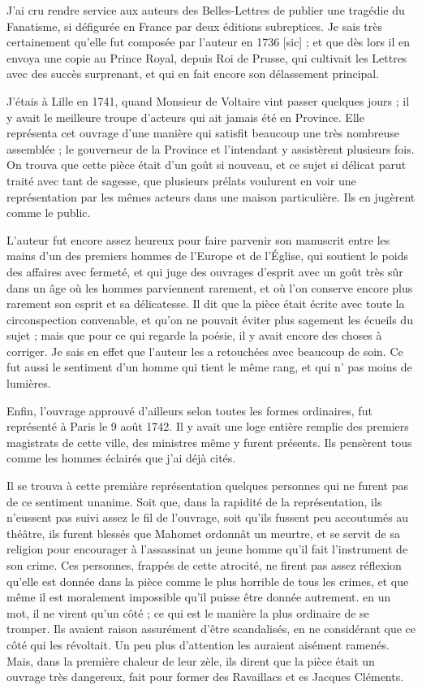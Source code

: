 \documentclass[french,twoside]{book} %
\begin{document}
\noindent J’ai cru rendre service aux auteurs des Belles-Lettres de publier une tragédie du Fanatisme, si défigurée en France par deux éditions subreptices. Je sais très certainement qu’elle fut composée par l’auteur en 1736 [sic] ; et que dès lors il en envoya une copie au Prince Royal, depuis Roi de Prusse, qui cultivait les Lettres avec des succès surprenant, et qui en fait encore son délassement principal.\par
J’étais à Lille en 1741, quand Monsieur de Voltaire vint passer quelques jours ; il y avait le meilleure troupe d’acteurs qui ait jamais été en Province. Elle représenta cet ouvrage d’une manière qui satisfit beaucoup une très nombreuse assemblée ; le gouverneur de la Province et l’intendant y assistèrent plusieurs fois. On trouva que cette pièce était d’un goût si nouveau, et ce sujet si délicat parut traité avec tant de sagesse, que plusieurs prélats voulurent en voir une représentation par les mêmes acteurs dans une maison particulière. Ils en jugèrent comme le public.\par
L’auteur fut encore assez heureux pour faire parvenir son manuscrit entre les mains d’un des premiers hommes de l’Europe et de l’Église, qui soutient le poids des affaires avec fermeté, et qui juge des ouvrages d’esprit avec un goût très sûr dans un âge où les hommes parviennent rarement, et où l’on conserve encore plus rarement son esprit et sa délicatesse. Il dit que la pièce était écrite avec toute la circonspection convenable, et qu’on ne pouvait éviter plus sagement les écueils du sujet ; mais que pour ce qui regarde la poésie, il y avait encore des choses à corriger. Je sais en effet que l’auteur les a retouchées avec beaucoup de soin. Ce fut aussi le sentiment d’un homme qui tient le même rang, et qui n’ pas moins de lumières.\par
Enfin, l’ouvrage approuvé d’ailleurs selon toutes les formes ordinaires, fut représenté à Paris le 9 août 1742. Il y avait une loge entière remplie des premiers magistrats de cette ville, des ministres même y furent présents. Ils pensèrent tous comme les hommes éclairés que j’ai déjà cités.\par
Il se trouva à cette premiàre représentation quelques personnes qui ne furent pas de ce sentiment unanime. Soit que, dans la rapidité de la représentation, ils n’eussent pas suivi assez le fil de l’ouvrage, soit qu’ils fussent peu accoutumés au théâtre, ils furent blessés que Mahomet ordonnât un meurtre, et se servit de sa religion pour encourager à l’assassinat un jeune homme qu’il fait l’instrument de son crime. Ces personnes, frappés de cette atrocité, ne firent pas assez réflexion qu’elle est donnée dans la pièce comme le plus horrible de tous les crimes, et que même il est moralement impossible qu’il puisse être donnée autrement. en un mot, il ne virent qu’un côté ; ce qui est le manière la plus ordinaire de se tromper. Ils avaient raison assurément d’être scandalisés, en ne considérant que ce côté qui les révoltait. Un peu plus d’attention les auraient aisément ramenés. Mais, dans la première chaleur de leur zèle, ils dirent que la pièce était un ouvrage très dangereux, fait pour former des Ravaillacs et es Jacques Cléments.\par
\end{document}
